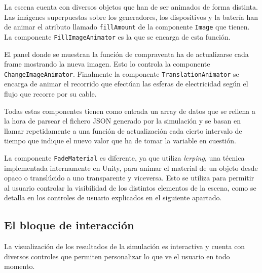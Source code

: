 \documentclass[12pt,a4paper,openright,oneside]{article}
\numberwithin{equation}{section}
\theoremstyle{definition}
\begin{document}
La escena cuenta con diversos objetos que han de ser animados de forma distinta. Las imágenes superpuestas sobre los generadores, los dispositivos y la batería han de animar el atributo llamado \texttt{fillAmount} de la componente \texttt{Image} que tienen. La componente \texttt{FillImageAnimator} es la que se encarga de esta función.

El panel donde se muestran la función de compraventa ha de actualizarse cada frame mostrando la nueva imagen. Esto lo controla la componente \texttt{ChangeImageAnimator}. Finalmente la componente \texttt{TranslationAnimator} se encarga de animar el recorrido que efectúan las esferas de electricidad según el flujo que recorre por su cable.

Todas estas componentes tienen como entrada un array de datos que se rellena a la hora de parsear el fichero JSON generado por la simulación y se basan en llamar repetidamente a una función de actualización cada cierto intervalo de tiempo que indique el nuevo valor que ha de tomar la variable en cuestión.

La componente \texttt{FadeMaterial} es diferente, ya que utiliza \textit{lerping}, una técnica implementada internamente en Unity, para animar el material de un objeto desde opaco o translúcido a uno transparente y viceversa. Esto se utiliza para permitir al usuario controlar la visibilidad de los distintos elementos de la escena, como se detalla en los controles de usuario explicados en el siguiente apartado.

\subsection{El bloque de interacción}

La visualización de los resultados de la simulación es interactiva y cuenta con diversos controles que permiten personalizar lo que ve el usuario en todo momento.
\end{document}
